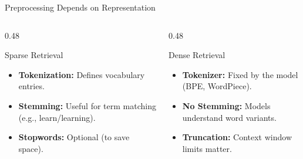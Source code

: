 \documentclass[aspectratio=169]{beamer}
\begin{document}
\begin{frame}[fragile]{Preprocessing Depends on Representation}
\begin{columns}[T]
\begin{column}{0.48\textwidth}
\begin{block}{Sparse Retrieval}
\begin{itemize}
    \item \faCut \textbf{Tokenization:} Defines vocabulary entries.
    \item \faLayerGroup \textbf{Stemming:} Useful for term matching (e.g., learn/learning).
    \item \faTrash[regular] \textbf{Stopwords:} Optional (to save space).
\end{itemize}
\end{block}
\end{column}

\begin{column}{0.48\textwidth}
\begin{block}{Dense Retrieval}
\begin{itemize}
    \item \faRobot \textbf{Tokenizer:} Fixed by the model (BPE, WordPiece).
    \item \faBan \textbf{No Stemming:} Models understand word variants.
    \item \faStream \textbf{Truncation:} Context window limits matter.
\end{itemize}
\end{block}
\end{column}
\end{columns}

\vspace{1em}

\begin{center}

\end{center}
\end{frame}
\end{document}
